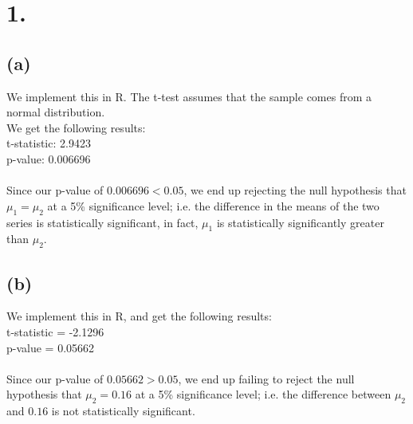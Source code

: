 \documentclass{article}
\begin{document}
\thispagestyle{firstpageheader}

\section*{1.}
{\Large 

\subsection*{(a)}

We implement this in R. The t-test assumes that the sample comes from a normal distribution.
\\
We get the following results: \\ 
t-statistic: 2.9423 \\
p-value: 0.006696 \\ \\
Since our p-value of $0.006696 < 0.05$, we end up rejecting the null hypothesis that $\mu_1 = \mu_2$ at a 5\% significance level; i.e. the difference in the means of the two series is statistically significant, in fact, $\mu_1$ is statistically significantly greater than $\mu_2$.

\subsection*{(b)}

We implement this in R, and get the following results: \\ 
t-statistic = -2.1296 \\
p-value = 0.05662 \\ \\ 
Since our p-value of $0.05662 > 0.05$, we end up failing to reject the null hypothesis that $\mu_2 = 0.16$ at a 5\% significance level; i.e. the difference between $\mu_2$ and $0.16$ is not statistically significant.
\newpage

}
\end{document}
